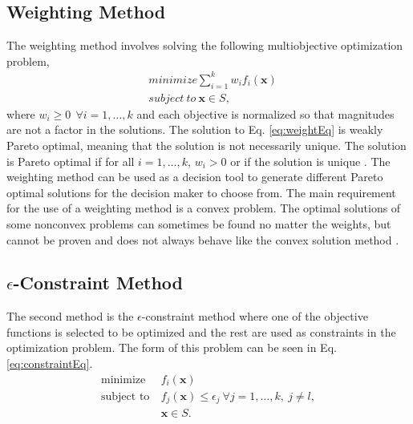 \subsection{Weighting Method}
The weighting method involves solving the following multiobjective optimization problem,
\begin{equation}
\begin{aligned}
    & minimize \sum^k_{i=1} w_if_i(\mathbf{x})\\
    & subject \ to \ \mathbf{x}\in S,
\end{aligned}
\label{eq:weightEq}
\end{equation}
where $w_i\geq 0 \ \ \forall i = 1,\dots,k$ and each objective is normalized so that magnitudes are not a factor in the solutions. The solution to Eq. \ref{eq:weightEq} is weakly Pareto optimal, meaning that the solution is not necessarily unique. The solution is Pareto optimal if for all $i = 1,\dots,k$, $w_i>0$ or if the solution is unique \cite{MultOptCS}. The weighting method can be used as a decision tool to generate different Pareto optimal solutions for the decision maker to choose from. The main requirement for the use of a weighting method is a convex problem. The optimal solutions of some nonconvex problems can sometimes be found no matter the weights, but cannot be proven and does not always behave like the convex solution method \cite{MultOptCS}.\par
\subsection{$\epsilon$-Constraint Method}
The second method is the $\epsilon$-constraint method where one of the objective functions is selected to be optimized and the rest are used as constraints in the optimization problem. The form of this problem can be seen in Eq. \ref{eq:constraintEq}.
\begin{equation}
    \begin{aligned}
    \text{minimize} \ & f_i(\mathbf{x})\\
    \text{subject to} \ & f_j(\mathbf{x})\leq \epsilon_j \ \forall j = 1,\dots,k, \ j\neq l,\\
    & \mathbf{x}\in S.
    \end{aligned}
    \label{eq:constraintEq}
\end{equation}
